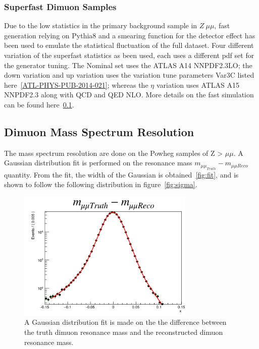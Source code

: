 \subsubsection{Superfast Dimuon Samples}
\label{section:superfast}
Due to the low statistics in the primary background sample in  $Z \> \mu \mu$, fast generation relying on Pythia8 and a smearing function for the detector effect has been used to emulate the statistical fluctuation of the full dataset. Four different variation of the superfast statistics as been used, each uses a different pdf set for the generator tuning. The Nominal set uses the ATLAS A14 NNPDF2.3LO; the down variation and up variation uses the variation tune parameters Var3C listed
here~\ref{ATL-PHYS-PUB-2014-021}; whereas the $\eta$ variation uses ATLAS A15 NNPDF2.3 along with QCD and QED NLO. More details on the fast simulation can be found here~\ref{}.

\subsection{Dimuon Mass Spectrum Resolution}
The mass spectrum resolution are done on the Powheg samples of Z > $\mu \mu
$. A Gaussian distribution fit is performed on the resonance mass $m_{\mu\mu_{Truth}} - m_{\mu\mu{Reco}}$ quantity. From the fit, the width of the Gaussian is obtained~\ref{fig:fit}, and is shown to follow the following distribution in figure~\ref{fig:sigma}.
    

\begin{figure}[!htb]
    \begin{center}
        \includegraphics[width=0.75\textwidth]{figures/chapter_dimuon/fitError}        
        \caption{
            A Gaussian distribution fit is made on the the difference between the truth dimuon resonance mass and the reconstructed dimuon resonance mass. }
    \end{center}
\end{figure}
   
